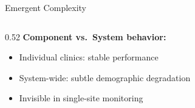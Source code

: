 \documentclass[aspectratio=169, 12pt]{beamer}
\begin{document}
\begin{frame}{Emergent Complexity}
\note{
%
%
%
%
}

\small
\begin{columns}[T]
  \begin{column}{0.52\textwidth}
    \textbf{Component vs.\ System behavior:}
    \begin{itemize}\setlength\itemsep{0pt}
      \item Individual clinics: stable performance
      \item System-wide: subtle demographic degradation
      \item Invisible in single-site monitoring
    \end{itemize}


\end{column}
\end{columns}
\end{frame}
\end{document}
